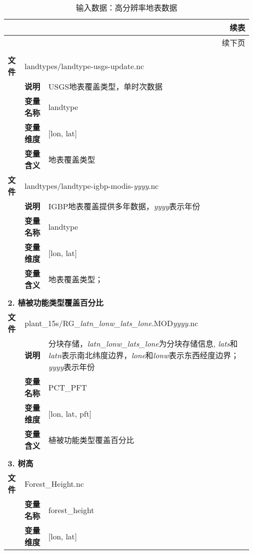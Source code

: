 {\small
\begin{longtable}{llp{}}
\caption{输入数据：高分辨率地表数据} \label{table_hires_rawdata} \\

\toprule
\endfirsthead
\multicolumn{3}{r}{{续表}} \\
\toprule
\endhead
\midrule
\multicolumn{3}{r}{{续下页}} \\
\endfoot
\bottomrule
\endlastfoot

\multicolumn{3}{l}{\textbf{1. 地表覆盖类型}} \\
\midrule
\textbf{文件} & \multicolumn{2}{l}{landtypes/landtype-usgs-update.nc} \\
&\textbf{说明} & USGS地表覆盖类型，单时次数据 \\
\cline{2-3}
&\textbf{变量名称} & landtype \\
&\textbf{变量维度} & {[}lon, lat{]}\\
&\textbf{变量含义} & 地表覆盖类型 \\
\cline{1-3}
\textbf{文件} & \multicolumn{2}{l}{landtypes/landtype-igbp-modis-\textit{yyyy}.nc} \\
&\textbf{说明} & IGBP地表覆盖提供多年数据，\textit{yyyy}表示年份 \\
\cline{2-3}
&\textbf{变量名称} & landtype \\
&\textbf{变量维度} & {[}lon, lat{]}\\
&\textbf{变量含义} & 地表覆盖类型； \\
\midrule
\vspace{2\baselineskip}\\
\multicolumn{3}{l}{\textbf{2. 植被功能类型覆盖百分比}} \\
\cline{1-3}
\textbf{文件} & \multicolumn{2}{l}{plant\_15s/RG\_\textit{latn\_lonw\_lats\_lone}.MOD\textit{yyyy}.nc} \\
& \textbf{说明} & 分块存储，\textit{latn\_lonw\_lats\_lone}为分块存储信息,  \textit{lats}和\textit{latn}表示南北纬度边界，\textit{lone}和\textit{lonw}表示东西经度边界；\textit{yyyy}表示年份 \\
\cline{2-3}
 & \textbf{变量名称} & PCT\_PFT \\
 & \textbf{变量维度} & {[}lon, lat, pft{]} \\
 & \textbf{变量含义} & 植被功能类型覆盖百分比 \\

\midrule
\vspace{2\baselineskip}\\
 \multicolumn{3}{l}{\textbf{3. 树高}} \\
\cline{1-3}
\textbf{文件} & \multicolumn{2}{l}{Forest\_Height.nc} \\
\cline{2-3}
& \textbf{变量名称} & forest\_height \\
& \textbf{变量维度} & {[}lon, lat{]} \\


\end{longtable}}
